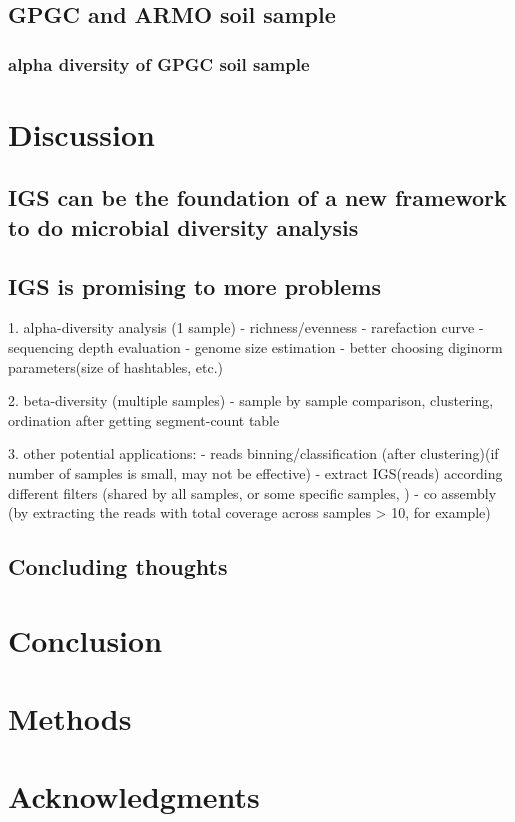 \subsection{GPGC and ARMO soil sample}

\subsubsection{alpha diversity of GPGC soil sample}





\section{Discussion}

\subsection{IGS can be the foundation of a new framework to do microbial diversity analysis}


\subsection{IGS is promising to more problems}

1. alpha-diversity analysis (1 sample)
    - richness/evenness
    - rarefaction curve
    - sequencing depth evaluation
    - genome size estimation
    - better choosing diginorm parameters(size of hashtables, etc.)

2. beta-diversity (multiple samples)
    - sample by sample comparison, clustering, ordination after getting segment-count table

3. other potential applications:
    - reads binning/classification (after clustering)(if number of samples is small, may not be effective)
    - extract IGS(reads) according different filters (shared by all samples, or some specific samples, )
    - co assembly (by extracting the reads with total coverage across samples > 10, for example)
    
    

\subsection{Concluding thoughts}



\section{Conclusion}

\section{Methods}

\section{Acknowledgments}



